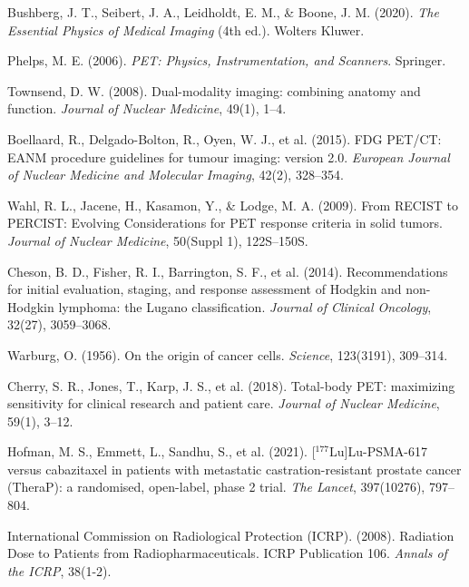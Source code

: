 \documentclass[11pt,a4paper]{article}
\begin{document}
\begin{enumerate}[label={[\arabic*]},leftmargin=*]
    \item Bushberg, J. T., Seibert, J. A., Leidholdt, E. M., \& Boone, J. M. (2020). \textit{The Essential Physics of Medical Imaging} (4th ed.). Wolters Kluwer.
    \item Phelps, M. E. (2006). \textit{PET: Physics, Instrumentation, and Scanners}. Springer.
    \item Townsend, D. W. (2008). Dual-modality imaging: combining anatomy and function. \textit{Journal of Nuclear Medicine}, 49(1), 1--4.
    \item Boellaard, R., Delgado-Bolton, R., Oyen, W. J., et al. (2015). FDG PET/CT: EANM procedure guidelines for tumour imaging: version 2.0. \textit{European Journal of Nuclear Medicine and Molecular Imaging}, 42(2), 328--354.
    \item Wahl, R. L., Jacene, H., Kasamon, Y., \& Lodge, M. A. (2009). From RECIST to PERCIST: Evolving Considerations for PET response criteria in solid tumors. \textit{Journal of Nuclear Medicine}, 50(Suppl 1), 122S--150S.
    \item Cheson, B. D., Fisher, R. I., Barrington, S. F., et al. (2014). Recommendations for initial evaluation, staging, and response assessment of Hodgkin and non-Hodgkin lymphoma: the Lugano classification. \textit{Journal of Clinical Oncology}, 32(27), 3059--3068.
    \item Warburg, O. (1956). On the origin of cancer cells. \textit{Science}, 123(3191), 309--314.
    \item Cherry, S. R., Jones, T., Karp, J. S., et al. (2018). Total-body PET: maximizing sensitivity for clinical research and patient care. \textit{Journal of Nuclear Medicine}, 59(1), 3--12.
    \item Hofman, M. S., Emmett, L., Sandhu, S., et al. (2021). [$^{177}\text{Lu}$]Lu-PSMA-617 versus cabazitaxel in patients with metastatic castration-resistant prostate cancer (TheraP): a randomised, open-label, phase 2 trial. \textit{The Lancet}, 397(10276), 797--804.
    \item International Commission on Radiological Protection (ICRP). (2008). Radiation Dose to Patients from Radiopharmaceuticals. ICRP Publication 106. \textit{Annals of the ICRP}, 38(1-2).
\end{enumerate}
\end{document}
